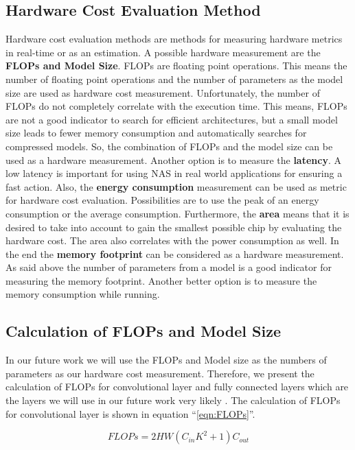 \documentclass[conference]{IEEEtran}
\begin{document}
\subsection{Hardware Cost Evaluation Method}
Hardware cost evaluation methods are methods for measuring hardware metrics in real-time or as an estimation. A possible hardware measurement are the \textbf{FLOPs and Model Size}. FLOPs are floating point operations. This means the number of floating point operations and the number of parameters as the model size are used as hardware cost measurement. Unfortunately, the number of FLOPs do not completely correlate with the execution time. This means, FLOPs are not a good indicator to search for efficient architectures, but a small model size leads to fewer memory consumption and automatically searches for compressed models. So, the combination of FLOPs and the model size can be used as a hardware measurement. Another option is to measure the \textbf{latency}. A low latency is important for using NAS in real world applications for ensuring a fast action. Also, the \textbf{energy consumption} measurement can be used as metric for hardware cost evaluation. Possibilities are to use the peak of an energy consumption or the average consumption. Furthermore, the \textbf{area} means that it is desired to take into account to gain the smallest possible chip by evaluating the hardware cost. The area also correlates with the power consumption as well. In the end the \textbf{memory footprint} can be considered as a hardware measurement. As said above the number of parameters from a model is a good indicator for measuring the memory footprint. Another better option is to measure the memory consumption while running. 

\subsection{Calculation of FLOPs and Model Size}
In our future work we will use the FLOPs and Model size as the numbers of parameters as our hardware cost measurement. Therefore, we present the calculation of FLOPs for convolutional layer and fully connected layers which are the layers we will use in our future work very likely \cite{bib5}. The calculation of FLOPs for convolutional layer is shown in equation ``\eqref{eqn:FLOPs}''.

\begin{equation}
\label{eqn:FLOPs}
FLOPs = 2HW(C_{in}K^{2}+1)C_{out}
\end{equation} 
\end{document}
